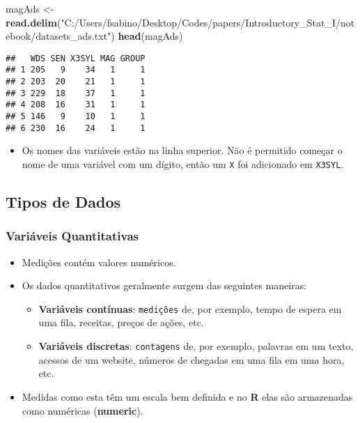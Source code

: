 \documentclass[]{article}
\newenvironment{Shaded}{\begin{snugshade}}{\end{snugshade}}
\newcommand{\KeywordTok}[1]{\textcolor[rgb]{0.13,0.29,0.53}{\textbf{#1}}}
\newcommand{\StringTok}[1]{\textcolor[rgb]{0.31,0.60,0.02}{#1}}
\newcommand{\NormalTok}[1]{#1}
\providecommand{\tightlist}{%
  \setlength{\itemsep}{0pt}\setlength{\parskip}{0pt}}
\begin{document}
\begin{Shaded}
\begin{Highlighting}[]
\NormalTok{magAds <-}\StringTok{ }\KeywordTok{read.delim}\NormalTok{(}\StringTok{"C:/Users/fsabino/Desktop/Codes/papers/Introductory_Stat_I/notebook/datasets_ads.txt"}\NormalTok{)}
\KeywordTok{head}\NormalTok{(magAds)}
\end{Highlighting}
\end{Shaded}

\begin{verbatim}
##   WDS SEN X3SYL MAG GROUP
## 1 205   9    34   1     1
## 2 203  20    21   1     1
## 3 229  18    37   1     1
## 4 208  16    31   1     1
## 5 146   9    10   1     1
## 6 230  16    24   1     1
\end{verbatim}

\begin{itemize}
\tightlist
\item
  Os nomes das variáveis estão na linha superior. Não é permitido
  começar o nome de uma variável com um dígito, então um \texttt{X} foi
  adicionado em \texttt{X3SYL}.
\end{itemize}

\subsection{Tipos de Dados}\label{tipos-de-dados}

\subsubsection{Variáveis Quantitativas}\label{variaveis-quantitativas}

\begin{itemize}
\tightlist
\item
  Medições contém valores numéricos.
\item
  Os dados quantitativos geralmente surgem das seguintes maneiras:

  \begin{itemize}
  \tightlist
  \item
    \textbf{Variáveis contínuas}: \texttt{medições} de, por exemplo,
    tempo de espera em uma fila, receitas, preços de ações, etc.
  \item
    \textbf{Variáveis discretas}: \texttt{contagens} de, por exemplo,
    palavras em um texto, acessos de um website, números de chegadas em
    uma fila em uma hora, etc.
  \end{itemize}
\item
  Medidas como esta têm um escala bem definida e no \textbf{R} elas são
  armazenadas como numéricas (\textbf{numeric}). 
\end{itemize}
\end{document}
